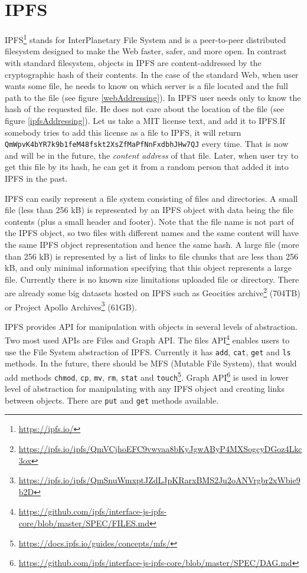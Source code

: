 \chapter{IPFS}
\label{ipfs}

IPFS\footnote{\url{https://ipfs.io/}} stands for InterPlanetary File System and is a peer-to-peer distributed filesystem designed to make the Web faster, safer, and more open. In contrast with standard filesystem, objects in IPFS are content-addressed by the cryptographic hash of their contents. In the case of the standard Web, when user wants some file, he needs to know on which server is a file located and the full path to the file (see figure \ref{webAddressing}). In IPFS user needs only to know the hash of the requested file. He does not care about the location of the file (see figure \ref{ipfsAddressing}). Let us take a MIT license text, and add it to IPFS.If somebody tries to add this license as a file to IPFS, it will return \texttt{QmWpvK4bYR7k9b1feM48fsk\-t2XsZfMaPfNnFxdbhJHw7QJ} every time. That is now and will be in the future, the \textit{content address} of that file. Later, when user try to get this file by its hash, he can get it from a random person that added it into IPFS in the past.

IPFS can easily represent a file system consisting of files and directories. A small file (less than 256 kB) is represented by an IPFS object with data being the file contents (plus a small header and footer). Note that the file name is not part of the IPFS object, so two files with different names and the same content will have the same IPFS object representation and hence the same hash. A large file (more than 256 kB) is represented by a list of links to file chunks that are less than 256 kB, and only minimal information specifying that this object represents a large file. Currently there is no known size limitations uploaded file or directory. There are already some big datasets hosted on IPFS such as Geocities archive\footnote{\url{https://ipfs.io/ipfs/QmVCjhoEFC9vwvaa8bKyJgwAByP4MXSogcyDGoz4Lkc3ox}} (704TB) or Project Apollo Archives\footnote{\url{https://ipfs.io/ipfs/QmSnuWmxptJZdLJpKRarxBMS2Ju2oANVrgbr2xWbie9b2D}} (61GB).

IPFS provides API for manipulation with objects in several levels of abstraction. Two most used APIs are Files and Graph API. 
The files API\footnote{\url{https://github.com/ipfs/interface-js-ipfs-core/blob/master/SPEC/FILES.md}} enables users to use the File System abstraction of IPFS. Currently it has \texttt{add},  \texttt{cat},  \texttt{get} and  \texttt{ls} methods. In the future, there should be MFS (Mutable File System), that would add methods \texttt{chmod}, \texttt{cp}, \texttt{mv}, \texttt{rm}, \texttt{stat} and \texttt{touch}\footnote{\url{https://docs.ipfs.io/guides/concepts/mfs/}}.
Graph API\footnote{\url{https://github.com/ipfs/interface-js-ipfs-core/blob/master/SPEC/DAG.md}} is used in lower level of abstraction for manipulating with any IPFS object and creating links between objects. There are \texttt{put} and \texttt{get} methods available. 

